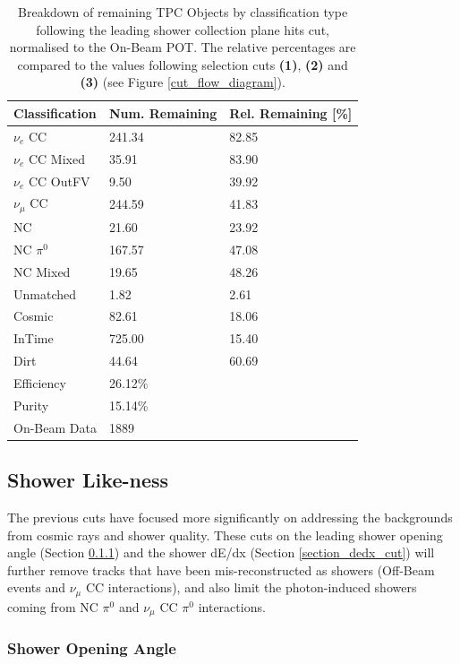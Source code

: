 \begin{table}[htbp]
\center
\begin{tabular}{l | l l }
Classification & Num. Remaining & Rel. Remaining [\%] \\
\hline
$\nu_e$ CC & 241.34 & 82.85 \\
$\nu_e$ CC Mixed & 35.91 & 83.90\\
$\nu_e$ CC OutFV & 9.50 & 39.92\\
$\nu_{\mu}$ CC & 244.59 & 41.83\\
NC & 21.60 & 23.92\\
NC $\pi^0$ & 167.57 & 47.08\\
NC Mixed & 19.65 & 48.26\\
Unmatched & 1.82 & 2.61\\
Cosmic & 82.61 & 18.06\\
InTime & 725.00 & 15.40\\
Dirt & 44.64 & 60.69\\
\hline
\hline
Efficiency & 26.12\%\\
Purity & 15.14\%\\
\hline
On-Beam Data & 1889\\
\hline
\end{tabular}
\caption{Breakdown of remaining TPC Objects by classification type following the leading shower collection plane hits cut, normalised to the On-Beam POT. The relative percentages are compared to the values following selection cuts \textbf{(1)}, \textbf{(2)} and \textbf{(3)} (see Figure \ref{cut_flow_diagram}).}
\label{selection_summary_table_collection_hits}
\end{table}

\FloatBarrier
\subsection{Shower Like-ness}
The previous cuts have focused more significantly on addressing the backgrounds from cosmic rays and shower quality. These cuts on the leading shower opening angle (Section \ref{section_open_angle_cut}) and the shower dE/dx (Section \ref{section_dedx_cut}) will further remove tracks that have been mis-reconstructed as showers (Off-Beam events and $\nu_{\mu}$ CC interactions), and also limit the photon-induced showers coming from NC $\pi^{0}$ and $\nu_{\mu}$ CC $\pi^{0}$ interactions.

\subsubsection{Shower Opening Angle}\label{section_open_angle_cut}

